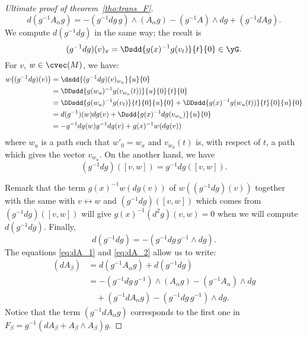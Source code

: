 \begin{proof}[Ultimate proof of theorem~\ref{tho:trans_F}]
	\begin{equation}\label{eq:dA_1}
		d(g^{-1} A_{\alpha} g)=-(g^{-1} dg\,g)\wedge(A_{\alpha} g)-(g^{-1} A)\wedge dg+(g^{-1} dA g).
	\end{equation}
	We compute $d(g^{-1} dg)$ in the same way; the result is
	\[
		(g^{-1} dg)(v)_x=\Dsdd{g(x)^{-1} g(v_t)}{t}{0}\in\yG.
	\]
	For $v$, $w\in\cvec(M)$, we have:
	\begin{equation}
		\begin{split}
			w\big((g^{-1} dg)(v)\big)&=\dsdd{ (g^{-1} dg)(v)_{w_u} }{u}{0}\\
			&=\DDsdd{  g(w_u)^{-1} g(v_{w_u}(t))  }{u}{0}{t}{0}\\
			&=\DDsdd{  g(w_u)^{-1} g(v_t)  }{t}{0}{u}{0}
			+\DDsdd{  g(x)^{-1} g(w_u(t))  }{t}{0}{u}{0}\\
			&=d(g^{-1})(w)dg(v)+\Dsdd{ g(x)^{-1} dg(v_{w_u}) }{u}{0}\\
			&=-g^{-1} dg(w)g^{-1} dg(v)+g(x)^{-1} w(dg(v))
		\end{split}
	\end{equation}
	where $w_u$ is a path such that $w'_0=w_x$ and $v_{w_u}(t)$ is, with respect of $t$, a path which gives the vector $v_{w_u}$. On the another hand, we have
	\[
		(g^{-1} dg)([v,w])=g^{-1} dg([v,w]).
	\]

	Remark that the term $g(x)^{-1} w(dg(v))$ of  $w((g^{-1} dg)(v))$ together with the same with $v\leftrightarrow w$ and $(g^{-1} dg)([v,w])$ which comes from  $(g^{-1} dg)([v,w])$ will give $g(x)^{-1}(d^2g)(v,w)=0$ when we will compute $d(g^{-1} dg)$.
	Finally,
	\begin{equation}\label{eq:dA_2}
		d(g^{-1} dg)=-(g^{-1} dg\,g^{-1}\wedge dg).
	\end{equation}
	The equations \eqref{eq:dA_1} and \eqref{eq:dA_2} allow us to write:
	\begin{equation}\label{eq:dA}
		\begin{split}
			(dA_{\beta})&=d(g^{-1} A_{\alpha} g)+d(g^{-1} dg)\\
			&=-(g^{-1} dg\,g^{-1}) \wedge(A_{\alpha} g)-(g^{-1} A_{\alpha})\wedge dg\\
			&\quad+(g^{-1} dA_{\alpha} g)-(g^{-1} dg\,g^{-1})\wedge dg.
		\end{split}
	\end{equation}
	Notice that the term $(g^{-1} dA_{\alpha} g)$ corresponds to the first one in $F_{\beta}=g^{-1}(dA_{\beta}+A_{\beta}\wedge A_{\beta})g$.


\end{proof}
